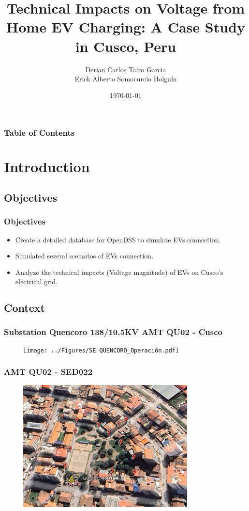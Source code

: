 \documentclass[10pt, aspectratio=1610]{beamer}
\title{Technical Impacts on Voltage from Home EV Charging: 
A Case Study in Cusco, Peru}
\author[Derian Tairo]{Derian Carlos Tairo Garcia \\
    Erick Alberto Somocurcio Holguín}
\date{\today}
\begin{document}
    
\begin{frame}
    \titlepage
\end{frame}

\begin{frame}
    \frametitle{Table of Contents}
    \tableofcontents
\end{frame}

\section{Introduction}
\subsection{Objectives}
\begin{frame}
    \frametitle{Objectives}
    \begin{itemize}%
        \item Create a detailed database for OpenDSS 
        to simulate EVs connection.
        \item Simulated several scenarios of EVs connection.
        \item Analyze the technical impacts (Voltage magnitude) of 
        EVs on Cusco's electrical grid.
    \end{itemize}
\end{frame}
\subsection{Context}
\begin{frame}
    \frametitle{Substation Quencoro 138/10.5KV AMT QU02 - Cusco}
    \begin{figure}
        \texttt{[image: ../Figures/SE QUENCORO\_Operación.pdf]}
    \end{figure}
\end{frame}

\begin{frame}
    \frametitle{AMT QU02 - SED022}
    \begin{figure}
        \includegraphics[width = 0.8\textwidth]{../Figures/casas.pdf}
    \end{figure}
\end{frame}
\end{document}
